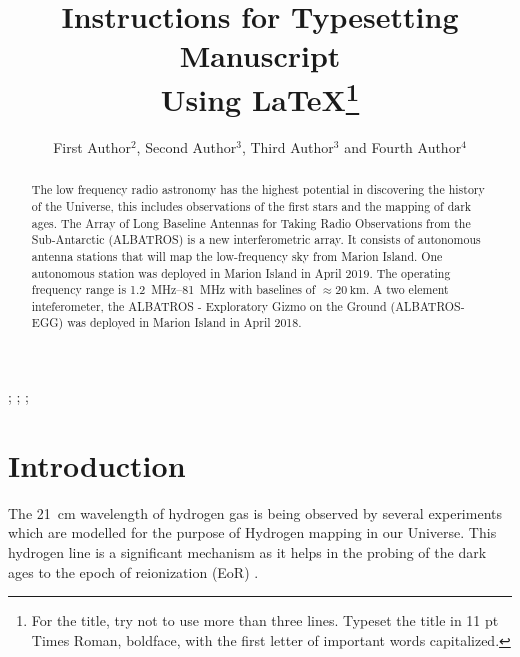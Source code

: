 \documentclass{ws-jai}
\begin{document}
\catchline{}{}{}{}{} %


\title{Instructions for Typesetting Manuscript\\
Using \LaTeX\footnote{For the title, try not to use more than
three lines. Typeset the title in 11 pt Times Roman,
boldface, with the first letter of important words capitalized.}}

\author{First Author$^{2}$, Second Author$^{3}$, Third Author$^{3}$ and Fourth Author$^{4}$}

\address{
$^{2}$Department, University Name, City, State ZIP/Zone, Country, fauthor@university.com\\
$^{3}$Group, Company, Address, City, State ZIP/Zone, Country\\
$^{4}$Group, Company, Address, City, State ZIP/Zone, Country, fauthor@company.com
}

\maketitle


\begin{history}
;
;
;
\end{history}

\begin{abstract}
The low frequency radio astronomy has the highest potential in discovering the history of the Universe, this includes observations of the first stars and the mapping of dark ages. The Array of Long Baseline Antennas for Taking Radio Observations from the Sub-Antarctic (ALBATROS) is a new interferometric array. It consists of autonomous antenna stations that will map the low-frequency sky from Marion Island. One autonomous station was deployed in Marion Island in April 2019. The operating frequency range is \SIrange{1.2}{81}{\MHz} with baselines of $\approx \SI{20}{\km}$. A two element inteferometer, the ALBATROS - Exploratory Gizmo on the Ground (ALBATROS-EGG) was deployed in Marion Island in April 2018. \\
\end{abstract}


\section{Introduction}
\noindent The \SI{21}{\cm} wavelength of hydrogen gas is being observed by several experiments which are modelled for the purpose of Hydrogen mapping in our Universe. This hydrogen line is a significant mechanism as it helps in the probing of the dark ages to the epoch of reionization (EoR) \cite{2013PhRvD..87d3002L,2014ApJ...782...66P}.\\
\end{document}

